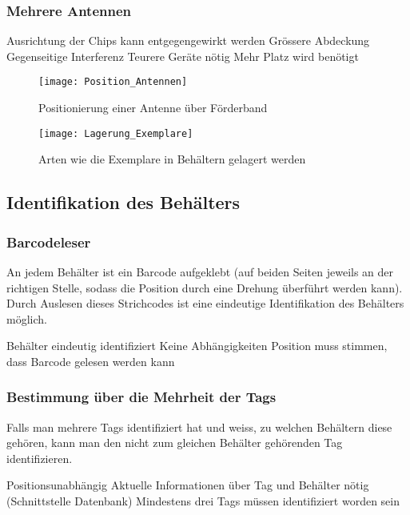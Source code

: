 \subsubsection{Mehrere Antennen}
\begin{itemize}
	\pro Ausrichtung der Chips kann entgegengewirkt werden
	\pro Grössere Abdeckung
	\con Gegenseitige Interferenz
	\con Teurere Geräte nötig
	\con Mehr Platz wird benötigt
\end{itemize}

\begin{figure}[htb]
	\centering
	\texttt{[image: Position\_Antennen]}
	\caption{Positionierung einer Antenne über Förderband}
	\label{fig:PosAntennen}
\end{figure}

\begin{figure}[htb]
	\centering
	\texttt{[image: Lagerung\_Exemplare]}
	\caption{Arten wie die Exemplare in Behältern gelagert werden}
	\label{fig:LagExemplare}
\end{figure}

\subsection{Identifikation des Behälters}

\subsubsection{Barcodeleser}
An jedem Behälter ist ein Barcode aufgeklebt (auf beiden Seiten jeweils an der richtigen Stelle, sodass die Position durch eine Drehung überführt werden kann). Durch Auslesen dieses Strichcodes ist eine eindeutige Identifikation des Behälters möglich.
\begin{itemize}
	\pro Behälter eindeutig identifiziert
	\pro Keine Abhängigkeiten
	\con Position muss stimmen, dass Barcode gelesen werden kann
\end{itemize}

\subsubsection{Bestimmung über die Mehrheit der Tags}
Falls man mehrere Tags identifiziert hat und weiss, zu welchen Behältern diese gehören, kann man den nicht zum gleichen Behälter gehörenden Tag identifizieren.
\begin{itemize}
	\pro Positionsunabhängig
	\con Aktuelle Informationen über Tag und Behälter nötig (Schnittstelle Datenbank)
	\con Mindestens drei Tags müssen identifiziert worden sein
\end{itemize}

